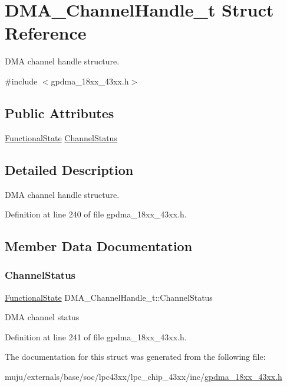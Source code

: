 \hypertarget{struct_d_m_a___channel_handle__t}{}\section{D\+M\+A\+\_\+\+Channel\+Handle\+\_\+t Struct Reference}
\label{struct_d_m_a___channel_handle__t}


D\+MA channel handle structure.  




{\ttfamily \#include $<$gpdma\+\_\+18xx\+\_\+43xx.\+h$>$}

\subsection*{Public Attributes}
\begin{DoxyCompactItemize}
\item 
\hyperlink{group___l_p_c___types___public___types_gac9a7e9a35d2513ec15c3b537aaa4fba1}{Functional\+State} \hyperlink{struct_d_m_a___channel_handle__t_ae776f1fa849f377ff64ffe9b8522105f}{Channel\+Status}
\end{DoxyCompactItemize}


\subsection{Detailed Description}
D\+MA channel handle structure. 

Definition at line 240 of file gpdma\+\_\+18xx\+\_\+43xx.\+h.



\subsection{Member Data Documentation}
\mbox{\label{struct_d_m_a___channel_handle__t_ae776f1fa849f377ff64ffe9b8522105f}} 
\subsubsection{\texorpdfstring{Channel\+Status}{ChannelStatus}}
{\footnotesize\ttfamily \hyperlink{group___l_p_c___types___public___types_gac9a7e9a35d2513ec15c3b537aaa4fba1}{Functional\+State} D\+M\+A\+\_\+\+Channel\+Handle\+\_\+t\+::\+Channel\+Status}

D\+MA channel status 

Definition at line 241 of file gpdma\+\_\+18xx\+\_\+43xx.\+h.



The documentation for this struct was generated from the following file\+:\begin{DoxyCompactItemize}
\item 
muju/externals/base/soc/lpc43xx/lpc\+\_\+chip\+\_\+43xx/inc/\hyperlink{gpdma__18xx__43xx_8h}{gpdma\+\_\+18xx\+\_\+43xx.\+h}\end{DoxyCompactItemize}
